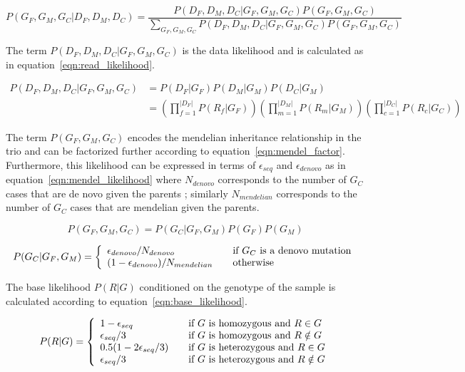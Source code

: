 \documentclass{article}
\begin{document}
\begin{equation}\label{eqn:model}
P(G_F,G_M,G_C|D_F,D_M,D_C) =  \frac{P(D_F,D_M,D_C|G_F,G_M,G_C)P(G_F,G_M,G_C)}{\sum_{G_F,G_M,G_C}P(D_F,D_M,D_C|G_F,G_M,G_C)P(G_F,G_M,G_C)}
\end{equation}

\noindent 
The term $P(D_F,D_M,D_C|G_F,G_M,G_C)$ is the data likelihood and is calculated as in equation~\ref{eqn:read_likelihood}. 

\begin{align}\label{eqn:read_likelihood}
P(D_F,D_M,D_C|G_F,G_M,G_C) &= P(D_F|G_F)P(D_M|G_M)P(D_C|G_M) \\
	&= \left(\prod_{f=1}^{|D_F|}P(R_f|G_F)\right)\left(\prod_{m=1}^{|D_M|}P(R_m|G_M)\right)\left(\prod_{c=1}^{|D_C|}P(R_c|G_C)\right)
\end{align}

\noindent
The term $P(G_F,G_M,G_C)$ encodes the mendelian inheritance relationship in the trio and can be factorized further according to equation~\ref{eqn:mendel_factor}. Furthermore, this likelihood can be expressed in terms of $\epsilon_{seq}$ and $\epsilon_{denovo}$ as in equation~\ref{eqn:mendel_likelihood} where $N_{denovo}$ corresponds to the number of $G_C$ cases that are de novo given the parents ; similarly $N_{mendelian}$ corresponds to the number of $G_C$ cases that are mendelian given the parents.

\begin{equation}\label{eqn:mendel_factor}
P(G_F,G_M,G_C) = P(G_C|G_F,G_M)P(G_F)P(G_M)
\end{equation}

\begin{equation}
\label{eqn:mendel_likelihood}
 P(G_C|G_F,G_M) = \left\{ 
  \begin{array}{l l}
    \epsilon_{denovo}/N_{denovo} & \quad \text{if $G_C$ is a denovo mutation}\\
    (1-\epsilon_{denovo})/N_{mendelian} & \quad \text{otherwise}
  \end{array} \right.
\end{equation}

\vspace{1em}
The base likelihood $P(R|G)$ conditioned on the genotype of the sample is calculated according to equation~\ref{eqn:base_likelihood}.

\begin{equation}
\label{eqn:base_likelihood}
P(R|G) = \left\{ 
  \begin{array}{l l}
    1-\epsilon_{seq} & \quad \text{if $G$ is homozygous and $R \in G$}\\
    \epsilon_{seq}/3 & \quad \text{if $G$ is homozygous and $R \notin G$}\\    
      0.5(1-2\epsilon_{seq}/3) & \quad \text{if $G$ is heterozygous and $R \in G$}\\
    \epsilon_{seq}/3 & \quad \text{if $G$ is heterozygous and $R \notin G$}
  \end{array} \right.
\end{equation}
  
\end{document}
